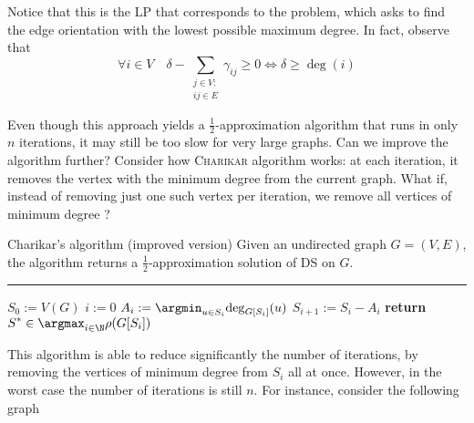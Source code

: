 \documentclass[a4paper, 12pt]{report}
\begin{document}
    Notice that this is the LP that corresponds to the  problem, which asks to find the edge orientation with the lowest possible maximum degree. In fact, observe that $$\forall i \in V \quad \delta - \sum_{\substack{j \in V : \\ ij \in E}}{\gamma_{ij}} \ge 0 \iff \delta \ge \deg(i)$$

    Even though this approach yields a $\tfrac{1}{2}$-approximation algorithm that runs in only $n$ iterations, it may still be too slow for very large graphs. Can we improve the algorithm further? Consider how \textsc{Charikar} algorithm works: at each iteration, it removes the vertex with the minimum degree from the current graph. What if, instead of removing just one such vertex per iteration, we remove all vertices of minimum degree ?

    \begin{framedalgo}{Charikar's algorithm (improved version)}
        Given an undirected graph $G = (V, E)$, the algorithm returns a $\tfrac{1}{2}$-approximation solution of DS on $G$. \\
        \hrule

        \quad
        \begin{algorithmic}[1]
                \State $S_0 := V(G)$
                \State $i := 0$
                    \State $\displaystyle A_i := \argmin_{u \in S_i}{\deg_{G[S_i]}(u)}$
                    \State $S_{i + 1} := S_i - A_i$
                \EndWhile
                \State \textbf{return} $\displaystyle S^* \in \argmax_{i \in \N}{\rho(G[S_i])}$
            \EndFunction
        \end{algorithmic}
    \end{framedalgo}

    This algorithm is able to reduce significantly the number of iterations, by removing the vertices of minimum degree from $S_i$ all at once. However, in the worst case the number of iterations is still $n$. For instance, consider the following graph 
\end{document}
